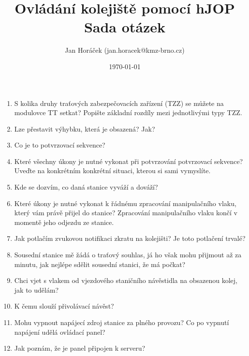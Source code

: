\documentclass[12pt,a4paper]{article}
\begin{document}
\thispagestyle{empty}
\noindent

\title{
\Large Ovládání kolejiště pomocí hJOP\\
\LARGE Sada otázek}
\author{Jan Horáček (jan.horacek@kmz-brno.cz)}
\date{\today}
\maketitle

\begin{enumerate}
	\item S kolika druhy traťových zabezpečovacích zařízení (TZZ) se můžete na modulovce TT setkat? Popište základní rozdíly mezi jednotlivými typy TZZ.
	
	\item Lze přestavit výhybku, která je obsazená? Jak?
	
	\item Co je to potvrzovací sekvence?
	
	\item Které všechny úkony je nutné vykonat při potvrzování potvrzovací sekvence? Uveďte na konkrétním konkrétní situaci, kterou si sami vymyslíte.
	
	\item Kde se dozvím, co daná stanice vyváží a dováží?
	
	\item Které úkony je nutné vykonat k řádnému zpracování manipulačního vlaku, který vám právě přijel do stanice? Zpracování manipulačního vlaku končí v momentě jeho odjezdu ze stanice.
	
	\item Jak potlačím zvukovou notifikaci zkratu na kolejišti? Je toto potlačení trvalé?
	
	\item Sousední stanice mě žádá o traťový souhlas, já ho však mohu přijmout až za minutu, jak nejlépe sdělit sousední stanici, že má počkat?
	
	\item Chci vjet s vlakem od vjezdového staničního návěstidla na obsazenou kolej, jak to udělám?
	
	\item K čemu slouží přivolávací návěst?
	
	\item Mohu vypnout napájecí zdroj stanice za plného provozu? Co po vypnutí napájení udělá ovládací panel?
	
	\item Jak poznám, že je panel připojen k serveru?
	

\end{enumerate}
\end{document}
